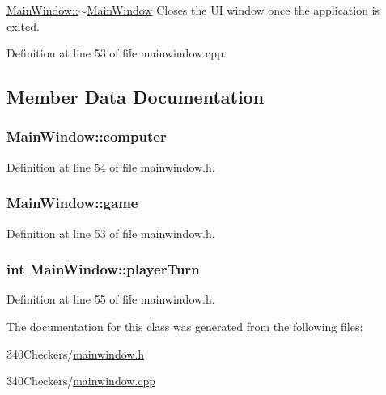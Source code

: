 \hyperlink{class_main_window_ae98d00a93bc118200eeef9f9bba1dba7}{Main\-Window\-::$\sim$\-Main\-Window} Closes the U\-I window once the application is exited. 



Definition at line 53 of file mainwindow.\-cpp.



\subsection{Member Data Documentation}
\hypertarget{class_main_window_a30196d7709d113dbd8262e67e7c629e2}{
\subsubsection[{computer}]{ Main\-Window\-::computer}}\label{class_main_window_a30196d7709d113dbd8262e67e7c629e2}


Definition at line 54 of file mainwindow.\-h.

\hypertarget{class_main_window_a508d487e6a6e565884e8376d6583df10}{
\subsubsection[{game}]{ Main\-Window\-::game}}\label{class_main_window_a508d487e6a6e565884e8376d6583df10}


Definition at line 53 of file mainwindow.\-h.

\hypertarget{class_main_window_ac8f0a233fbd35200774024901d525b25}{
\subsubsection[{player\-Turn}]{\setlength{\rightskip}{0pt plus 5cm}int Main\-Window\-::player\-Turn}}\label{class_main_window_ac8f0a233fbd35200774024901d525b25}


Definition at line 55 of file mainwindow.\-h.



The documentation for this class was generated from the following files\-:\begin{DoxyCompactItemize}
\item 
340\-Checkers/\hyperlink{mainwindow_8h}{mainwindow.\-h}\item 
340\-Checkers/\hyperlink{mainwindow_8cpp}{mainwindow.\-cpp}\end{DoxyCompactItemize}
